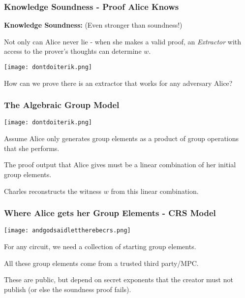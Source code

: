 \documentclass{beamer}
\begin{document}
\begin{frame}
    
    \frametitle{Knowledge Soundness - Proof Alice Knows}

    \textbf{Knowledge Soundness:} (Even stronger than soundness!)
    
    Not only can Alice never lie - when she makes a valid proof, an \textit{Extractor} with access to the prover's thoughts can determine $w$.

    \begin{center}
        \texttt{[image: dontdoiterik.png]}        
    \end{center}

    How can we prove there is an extractor that works for any adversary Alice?

    
\end{frame}


\begin{frame}
    
    \frametitle{The Algebraic Group Model}

    \begin{center}
        \texttt{[image: dontdoiterik.png]}        
    \end{center}

    Assume Alice only generates group elements as a product of group operations that she performs.
    
    The proof output that Alice gives must be a linear combination of her initial group elements.
    
    Charles reconstructs the witness $w$ from this linear combination.


    
\end{frame}

\begin{frame}
    
    \frametitle{Where Alice gets her Group Elements - CRS Model}

    \begin{center}
        \texttt{[image: andgodsaidlettherebecrs.png]}        
    \end{center}

    For any circuit, we need a collection of starting group elements.

    All these group elements come from a trusted third party/MPC.
    
    These are public, but depend on secret exponents that the creator must not publish (or else the soundness proof fails).
    
\end{frame}
\end{document}
